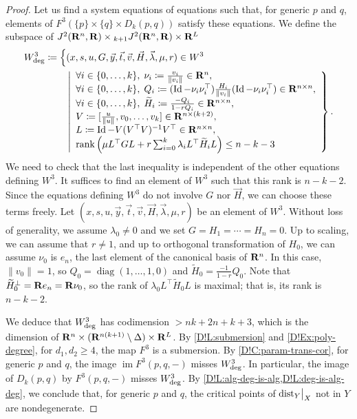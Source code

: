 \begin{proof}
  Let us find a system equations of equations such that, for generic $p$ and $q$, elements of $F^3(\{p\} \times \{q\} \times D_k(p, q))$ satisfy these equations.
  We define the subspace of $J^2(\mathbf{R}^n, \mathbf{R}) \times {}_{k + 1} J^2(\mathbf{R}^n, \mathbf{R}) \times \mathbf{R}^L$
  \begin{align*}
    W^3_{\textnormal{deg}} \coloneq \Big\{ & (x, s, u, G, \vec{y}, \vec{t}, \vec{v}, \vec{H}, \vec{\lambda}, \mu, r) \in W^3 \\
    & \left| \begin{array}{l}
      \forall i \in \{0, \ldots, k\}, \; \nu_i \coloneq \frac{v_i}{\| v_i \|} \in \mathbf{R}^n, \\
      \forall i \in \{0, \ldots, k\}, \; Q_i \coloneq (\operatorname{Id} - \nu_i \nu_i^\top) \frac{H_i}{\|v_i\|} (\operatorname{Id} - \nu_i \nu_i^\top) \in \mathbf{R}^{n \times n}, \\
      \forall i \in \{0, \ldots, k\}, \; \widetilde{H}_i \coloneq \frac{-Q_i}{1 - r Q_i} \in \mathbf{R}^{n \times n}, \\
      V \coloneq [\frac{u}{\|u\|}, v_0, \ldots, v_k] \in \mathbf{R}^{n \times (k + 2)}, \\
      L \coloneq \operatorname{Id} - V (V^\top V)^{-1} V^\top \in \mathbf{R}^{n \times n}, \\
      \operatorname{rank} \left( \mu L^\top G L + r \sum_{i = 0}^k \lambda_i L^\top \widetilde{H}_i L \right) \leq n - k - 3 
    \end{array}
    \right\}.
  \end{align*}
  We need to check that the last inequality is independent of the other equations defining $W^3$. It suffices to find an element of $W^3$ such that this rank is $n - k - 2$. Since the equations defining $W^3$ do not involve $G$ nor $\vec{H}$, we can choose these terms freely. Let $(x, s, u, \vec{y}, \vec{t}, \vec{v}, \vec{H}, \vec{\lambda}, \mu, r)$ be an element of $W^3$. Without loss of generality, we assume $\lambda_0 \neq 0$ and we set $G = H_1 = \cdots = H_n = 0$. Up to scaling, we can assume that $r \neq 1$, and up to orthogonal transformation of $H_0$, we can assume $\nu_0$ is $e_n$, the last element of the canonical basis of $\mathbf{R}^n$. In this case, $\| v_0 \| = 1$, so $Q_0 = \operatorname{diag}(1, \ldots, 1, 0)$ and $\widetilde{H}_0 = \frac{-1}{1 - r} Q_0$. Note that $\widetilde{H}_0^\bot = \mathbf{R} e_n = \mathbf{R} \nu_0$, so the rank of $\lambda_0 L^\top \widetilde{H}_0 L$ is maximal; that is, its rank is $n - k - 2$.

  We deduce that $W^3_{\textnormal{deg}}$ has codimension $> nk + 2n + k + 3$, which is the dimension of $\mathbf{R}^n \times (\mathbf{R}^{n(k + 1)} \setminus \Delta) \times \mathbf{R}^L$. By \cref{D!L:submersion} and \cref{D!Ex:poly-degree}, for $d_1, d_2 \geq 4$, the map $F^3$ is a submersion.
  By \cref{D!C:param-trans-cor}, for generic $p$ and $q$, the image $\operatorname{im} F^3(p, q, -)$ misses $W^3_{\textnormal{deg}}$. In particular, the image of $D_k(p, q)$ by $F^3(p, q, -)$ misses $W^3_{\textnormal{deg}}$. By \cref{D!L:alg-deg-is-alg,D!L:deg-is-alg-deg}, we conclude that, for generic $p$ and $q$, the critical points of $\mathord{\operatorname{dist}}_Y\big|_X$ not in $Y$ are nondegenerate.
\end{proof}

